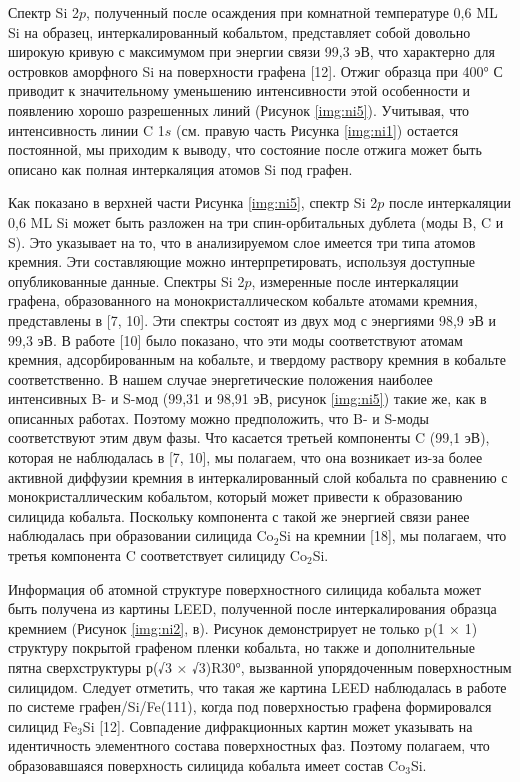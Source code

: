 Спектр Si 2$p$, полученный после осаждения при комнатной температуре 0,6 ML Si на образец, интеркалированный кобальтом, представляет собой довольно широкую кривую с максимумом при энергии связи 99,3 эВ, что характерно для островков аморфного Si на поверхности графена [12]. Отжиг образца при 400° С приводит к значительному уменьшению интенсивности этой особенности и появлению хорошо разрешенных линий (Рисунок \ref{img:ni5}). Учитывая, что интенсивность линии C 1$s$ (см. правую часть Рисунка \ref{img:ni1}) остается постоянной, мы приходим к выводу, что состояние после отжига может быть описано как полная интеркаляция атомов Si под графен. 

Как показано в верхней части Рисунка \ref{img:ni5}, спектр Si 2$p$ после интеркаляции 0,6 ML Si может быть разложен на три спин-орбитальных дублета (моды B, C и S). Это указывает на то, что в анализируемом слое имеется три типа атомов кремния. Эти составляющие можно интерпретировать, используя доступные опубликованные данные. Спектры Si 2$p$, измеренные после интеркаляции графена, образованного на монокристаллическом кобальте атомами кремния, представлены в [7, 10]. Эти спектры состоят из двух мод с энергиями 98,9 эВ и 99,3 эВ. В работе [10] было показано, что эти моды соответствуют атомам кремния, адсорбированным на кобальте, и твердому раствору кремния в кобальте соответственно. В нашем случае энергетические положения наиболее интенсивных B- и S-мод (99,31 и 98,91 эВ, рисунок \ref{img:ni5}) такие же, как в описанных работах. Поэтому можно предположить, что B- и S-моды соответствуют этим двум фазы. Что касается третьей компоненты C (99,1 эВ), которая не наблюдалась в [7, 10], мы полагаем, что она возникает из-за более активной диффузии кремния в интеркалированный слой кобальта по сравнению с монокристаллическим кобальтом, который может привести к образованию силицида кобальта. Поскольку компонента с такой же энергией связи ранее наблюдалась при образовании силицида Co$_2$Si на кремнии [18], мы полагаем, что третья компонента C соответствует силициду Co$_2$Si.

Информация об атомной структуре поверхностного силицида кобальта может быть получена из картины LEED, полученной после интеркалирования образца кремнием (Рисунок \ref{img:ni2}, в). Рисунок демонстрирует не только p(1 × 1) структуру покрытой графеном пленки кобальта, но также и дополнительные пятна сверхструктуры р(√3 × √3)R30°, вызванной упорядоченным поверхностным силицидом. Следует отметить, что такая же картина LEED наблюдалась в работе по системе графен/Si/Fe(111), когда под поверхностью графена формировался силицид Fe$_3$Si [12]. Совпадение дифракционных картин может указывать на идентичность элементного состава поверхностных фаз. Поэтому полагаем, что образовавшаяся поверхность силицида кобальта имеет состав Co$_3$Si.

